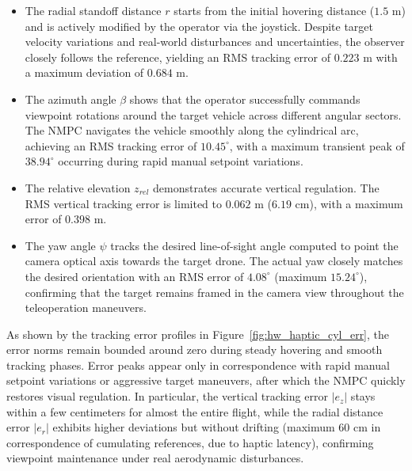 \begin{itemize}
    \item The radial standoff distance $r$ starts from the initial hovering distance ($1.5\text{ m}$) and is actively modified by the operator via the joystick. Despite target velocity variations and real-world disturbances and uncertainties, the observer closely follows the reference, yielding an RMS tracking error of $0.223\text{ m}$ with a maximum deviation of $0.684\text{ m}$.
    \item The azimuth angle $\beta$ shows that the operator successfully commands viewpoint rotations around the target vehicle across different angular sectors. The NMPC navigates the vehicle smoothly along the cylindrical arc, achieving an RMS tracking error of $10.45^\circ$, with a maximum transient peak of $38.94^\circ$ occurring during rapid manual setpoint variations.
    \item The relative elevation $z_{rel}$ demonstrates accurate vertical regulation. The RMS vertical tracking error is limited to $0.062\text{ m}$ ($6.19\text{ cm}$), with a maximum error of $0.398\text{ m}$.
    \item The yaw angle $\psi$ tracks the desired line-of-sight angle computed to point the camera optical axis towards the target drone. The actual yaw closely matches the desired orientation with an RMS error of $4.08^\circ$ (maximum $15.24^\circ$), confirming that the target remains framed in the camera view throughout the teleoperation maneuvers.
\end{itemize}
As shown by the tracking error profiles in Figure~\ref{fig:hw_haptic_cyl_err}, the error norms remain bounded around zero during steady hovering and smooth tracking phases. Error peaks appear only in correspondence with rapid manual setpoint variations or aggressive target maneuvers, after which the NMPC quickly restores visual regulation. In particular, the vertical tracking error $|e_z|$ stays within a few centimeters for almost the entire flight, while the radial distance error $|e_r|$ exhibits higher deviations but without drifting (maximum $60$ cm in correspondence of cumulating references, due to haptic latency), confirming viewpoint maintenance under real aerodynamic disturbances.

